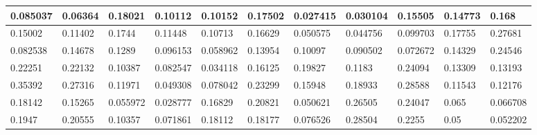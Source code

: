 \begin{tabular}{|l|l|l|l|l|l|l|l|l|l|l|}
\hline
0.085037&0.06364&0.18021&0.10112&0.10152&0.17502&0.027415&0.030104&0.15505&0.14773&0.168\\\hline
0.15002&0.11402&0.1744&0.11448&0.10713&0.16629&0.050575&0.044756&0.099703&0.17755&0.27681\\\hline
0.082538&0.14678&0.1289&0.096153&0.058962&0.13954&0.10097&0.090502&0.072672&0.14329&0.24546\\\hline
0.22251&0.22132&0.10387&0.082547&0.034118&0.16125&0.19827&0.1183&0.24094&0.13309&0.13193\\\hline
0.35392&0.27316&0.11971&0.049308&0.078042&0.23299&0.15948&0.18933&0.28588&0.11543&0.12176\\\hline
0.18142&0.15265&0.055972&0.028777&0.16829&0.20821&0.050621&0.26505&0.24047&0.065&0.066708\\\hline
0.1947&0.20555&0.10357&0.071861&0.18112&0.18177&0.076526&0.28504&0.2255&0.05&0.052202\\\hline
\end{tabular}
